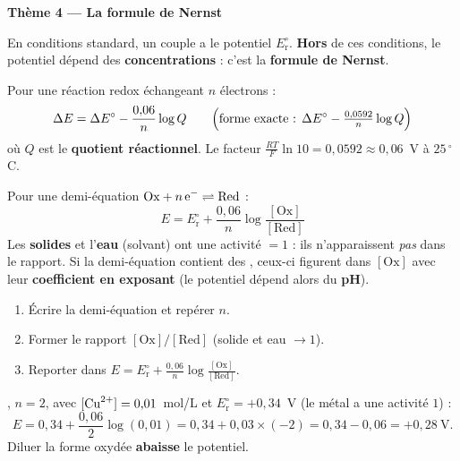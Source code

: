 \documentclass[11pt,a4paper]{article}
\begin{document}
\begin{center}\color{primarydark}\Large\bfseries Thème 4 — La formule de Nernst\end{center}

En conditions standard, un couple a le potentiel $E_{\mathrm{r}}^{\circ}$. \textbf{Hors} de ces
conditions, le potentiel dépend des \textbf{concentrations} : c'est la \textbf{formule de Nernst}.

\begin{cle}
Pour une réaction redox échangeant $n$ électrons :
\[
\Delta E=\Delta E^{\circ}-\frac{0{,}06}{n}\log Q
\qquad\Bigl(\text{forme exacte : }\Delta E^{\circ}-\tfrac{0{,}0592}{n}\log Q\Bigr)
\]
où $Q$ est le \textbf{quotient réactionnel}. Le facteur $\tfrac{RT}{F}\ln 10=0{,}0592\approx 0{,}06$~V à
$25\,^{\circ}$C.
\end{cle}

\begin{cle}
Pour une demi-équation $\mathrm{Ox}+n\,\ce{e^-}\rightleftharpoons\mathrm{Red}$ :
\[
E=E_{\mathrm{r}}^{\circ}+\frac{0{,}06}{n}\log\frac{[\mathrm{Ox}]}{[\mathrm{Red}]}
\]
Les \textbf{solides} et l'\textbf{eau} (solvant) ont une activité $=1$ : ils n'apparaissent
\emph{pas} dans le rapport. Si la demi-équation contient des , ceux-ci figurent dans $[\mathrm{Ox}]$
avec leur \textbf{coefficient en exposant} (le potentiel dépend alors du \textbf{pH}).
\end{cle}

\begin{methode}
\begin{enumerate}[label=\textbf{\arabic*.},leftmargin=2.0em,topsep=1pt,itemsep=1pt]
  \item Écrire la demi-équation et repérer $n$.
  \item Former le rapport $[\mathrm{Ox}]/[\mathrm{Red}]$ (solide et eau $\to 1$).
  \item Reporter dans $E=E_{\mathrm{r}}^{\circ}+\tfrac{0{,}06}{n}\log\frac{[\mathrm{Ox}]}{[\mathrm{Red}]}$.
\end{enumerate}
\end{methode}

\begin{exemplebox}
, $n=2$, avec $[\ce{Cu^{2+}}]=0{,}01$~mol/L et
$E_{\mathrm{r}}^{\circ}=+0{,}34$~V (le métal  a une activité $1$) :
\[
E=0{,}34+\frac{0{,}06}{2}\log(0{,}01)=0{,}34+0{,}03\times(-2)=0{,}34-0{,}06=+0{,}28~\text{V}.
\]
Diluer la forme oxydée \textbf{abaisse} le potentiel.
\end{exemplebox}
\end{document}
